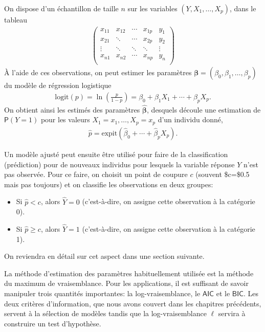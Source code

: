 \documentclass[
  11pt,
  letterpaper,
]{book}
\providecommand{\tightlist}{%
  \setlength{\itemsep}{0pt}\setlength{\parskip}{0pt}}
\theoremstyle{definition}
\theoremstyle{definition}
\theoremstyle{definition}
\theoremstyle{remark}
\begin{document}
On dispose d'un échantillon de taille \(n\) sur les variables \((Y, X_1, \ldots, X_p)\), dans le tableau
\begin{align*}
 \begin{pmatrix}
 x_{11} & x_{12} & \cdots & x_{1p} & y_1 \\
 x_{21} & \ddots & \cdots & x_{2p} & y_2 \\
 \vdots & \ddots & \ddots & \ddots & \vdots \\
 x_{n1} & x_{n2} & \cdots & x_{np} & y_n \\
 \end{pmatrix}
\end{align*}
À l'aide de ces observations, on peut estimer les paramètres \(\boldsymbol{\beta} = (\beta_0, \beta_1 ,\ldots, \beta_p)\) du modèle de régression logistique
\begin{align*}
\mathrm{logit}(p) = \ln \left( \frac{p}{1-p}\right) = \beta_0 + \beta_1 X_1 + \cdots + \beta_pX_p.
\end{align*}
On obtient ainsi les estimés des paramètres \(\widehat{\boldsymbol{\beta}}\), desquels découle une estimation de \({\mathsf P}\left(Y=1\right)\) pour les valeurs \(X_1=x_1, \ldots, X_p=x_p\) d'un individu donné,
\begin{align*}
 \widehat{p} = \mathrm{expit}(\widehat{\beta}_0 + \cdots + \widehat{\beta}_pX_p).
\end{align*}

Un modèle ajusté peut ensuite être utilisé pour faire de la classification (prédiction) pour de nouveaux individus pour lesquels la variable réponse \(Y\) n'est pas observée. Pour ce faire, on choisit un point de coupure \(c\) (souvent \$c=\$0.5 mais pas toujours) et on classifie les observations en deux groupes:

\begin{itemize}
\tightlist
\item
  Si \(\widehat{p}< c\), alors \(\widehat{Y}=0\) (c'est-à-dire, on assigne cette observation à la catégorie 0).
\item
  Si \(\widehat{p} \geq c\), alors \(\widehat{Y}=1\) (c'est-à-dire, on assigne cette observation à la catégorie 1).
\end{itemize}

On reviendra en détail sur cet aspect dans une section suivante.

La méthode d'estimation des paramètres habituellement utilisée est la méthode du maximum de vraisemblance. Pour les applications, il est suffisant de savoir manipuler trois quantités importantes: la log-vraisemblance, le \(\mathsf{AIC}\) et le \(\mathsf{BIC}\). Les deux critères d'information, que nous avons couvert dans les chapitres précédents, servent à la sélection de modèles tandis que la log-vraisemblance \(\ell\) servira à construire un test d'hypothèse.
\end{document}
